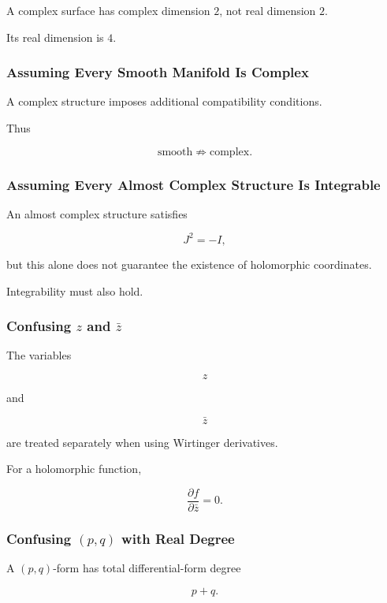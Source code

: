 A complex surface has complex dimension \(2\), not real dimension \(2\).

Its real dimension is \(4\).

\subsubsection{Assuming Every Smooth Manifold Is Complex}

A complex structure imposes additional compatibility conditions.

Thus

\[
\boxed{
\text{smooth}
\not\Longrightarrow
\text{complex}.
}
\]

\subsubsection{Assuming Every Almost Complex Structure Is Integrable}

An almost complex structure satisfies

\[
J^2=-I,
\]

but this alone does not guarantee the existence of holomorphic coordinates.

Integrability must also hold.

\subsubsection{Confusing \(z\) and \(\bar z\)}

The variables

\[
z
\]

and

\[
\bar z
\]

are treated separately when using Wirtinger derivatives.

For a holomorphic function,

\[
\boxed{
\frac{\partial f}{\partial\bar z}=0.
}
\]

\subsubsection{Confusing \((p,q)\) with Real Degree}

A \((p,q)\)-form has total differential-form degree

\[
\boxed{p+q.}
\]

